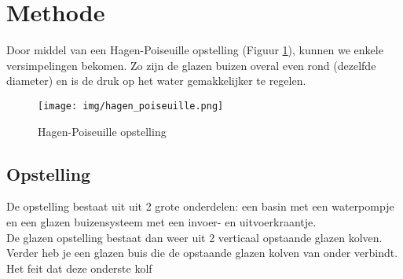 \section{Methode}

Door middel van een Hagen-Poiseuille opstelling
(Figuur \ref{fig:hagen-pois}), kunnen we enkele
versimpelingen bekomen. Zo zijn de glazen buizen
overal even rond (dezelfde diameter) en is de druk
op het water gemakkelijker te regelen.

\begin{figure}[h]
    \centering
    \caption{Hagen-Poiseuille opstelling}
    \texttt{[image: img/hagen\_poiseuille.png]}
    \label{fig:hagen-pois}
\end{figure}

\subsection{Opstelling}

De opstelling bestaat uit uit 2 grote onderdelen: een basin
met een waterpompje en een glazen buizensysteem met
een invoer- en uitvoerkraantje.
\\
De glazen opstelling bestaat dan weer uit 2 verticaal
opstaande glazen kolven. Verder heb je een glazen buis
die de opstaande glazen kolven van onder verbindt.
Het feit dat deze onderste kolf
